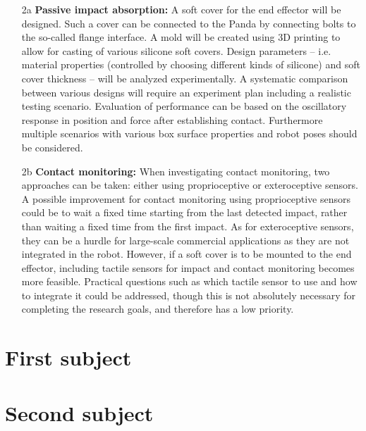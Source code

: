 \documentclass[11pt]{report}
\numberwithin{equation}{section}        %
\numberwithin{figure}{section}          %
\numberwithin{table}{section}           %
\begin{document}
\begin{enumerate}
   \item[2a] \textbf{Passive impact absorption:} A soft cover for the end effector will be designed. Such a cover can be connected to the Panda by connecting bolts to the so-called flange interface. A mold will be created using 3D printing to allow for casting of various silicone soft covers. Design parameters -- i.e. material properties (controlled by choosing different kinds of silicone) and soft cover thickness -- will be analyzed experimentally. A systematic comparison between various designs will require an experiment plan including a realistic testing scenario. Evaluation of performance can be based on the oscillatory response in position and force after establishing contact. Furthermore multiple scenarios with various box surface properties and robot poses should be considered.
  
  \item[2b] \textbf{Contact monitoring:} When investigating contact monitoring, two approaches can be taken: either using proprioceptive or exteroceptive sensors. A possible improvement for contact monitoring using proprioceptive sensors could be to wait a fixed time starting from the last detected impact, rather than waiting a fixed time from the first impact. As for exteroceptive sensors, they can be a hurdle for large-scale commercial applications as they are not integrated in the robot. However, if a soft cover is to be mounted to the end effector, including tactile sensors for impact and contact monitoring becomes more feasible. Practical questions such as which tactile sensor to use and how to integrate it could be addressed, though this is not absolutely necessary for completing the research goals, and therefore has a low priority.
  \end{enumerate}
  \newpage
  \section{First subject}

  \section{Second subject}

  \newpage
  \printbibliography[title=References]

  \newpage
  \thispagestyle{empty} \ \newpage
\end{document}
